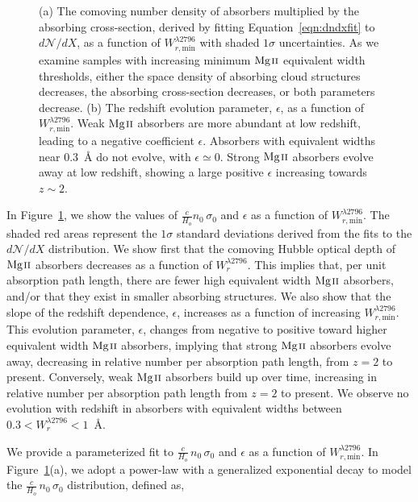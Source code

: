\begin{figure*}[bth]
\caption{(a) The comoving number density of absorbers multiplied by the absorbing cross-section, derived by fitting Equation~\ref{eqn:dndxfit} to $d\mathcal{N}\!/dX$, as a function of $W_{r,\mathrm{min}}^{\lambda2796}$ with shaded $1\sigma$ uncertainties. As we examine samples with increasing minimum ${\hbox{{\rm Mg}\kern 0.1em{\sc ii}}}$ equivalent width thresholds, either the space density of absorbing cloud structures decreases, the absorbing cross-section decreases, or both parameters decrease. (b) The redshift evolution parameter, $\epsilon$, as a function of $W_{r,\mathrm{min}}^{\lambda2796}$. Weak ${\hbox{{\rm Mg}\kern 0.1em{\sc ii}}}$ absorbers are more abundant at low redshift, leading to a negative coefficient $\epsilon$. Absorbers with equivalent widths near $0.3$~{\AA} do not evolve, with $\epsilon \simeq 0$. Strong ${\hbox{{\rm Mg}\kern 0.1em{\sc ii}}}$ absorbers evolve away at low redshift, showing a large positive $\epsilon$ increasing towards $z \sim 2$.}
\label{fig:nsigmaepsilon}
\end{figure*}

In Figure~\ref{fig:nsigmaepsilon}, we show the values of $\frac{c}{H_o}n_0\,\sigma_0$ and $\epsilon$ as a function of $W_{r,\mathrm{min}}^{\lambda2796}$. The shaded red areas represent the $1\sigma$ standard deviations derived from the fits to the $d\mathcal{N}\!/dX$ distribution. We show first that the comoving Hubble optical depth of ${\hbox{{\rm Mg}\kern 0.1em{\sc ii}}}$ absorbers decreases as a function of $W_r^{\lambda2796}$. This implies that, per unit absorption path length, there are fewer high equivalent width ${\hbox{{\rm Mg}\kern 0.1em{\sc ii}}}$ absorbers, and/or that they exist in smaller absorbing structures. We also show that the slope of the redshift dependence, $\epsilon$, increases as a function of increasing $W_{r,\mathrm{min}}^{\lambda2796}$. This evolution parameter, $\epsilon$, changes from negative to positive toward higher equivalent width ${\hbox{{\rm Mg}\kern 0.1em{\sc ii}}}$ absorbers, implying that strong ${\hbox{{\rm Mg}\kern 0.1em{\sc ii}}}$ absorbers evolve away, decreasing in relative number per absorption path length, from $z = 2$ to present. Conversely, weak ${\hbox{{\rm Mg}\kern 0.1em{\sc ii}}}$ absorbers build up over time, increasing in relative number per absorption path length from $z = 2$ to present. We observe no evolution with redshift in absorbers with equivalent widths between $0.3 < W_r^{\lambda2796} < 1$~{\AA}.

We provide a parameterized fit to $\frac{c}{H_o}\,n_0\,\sigma_0$ and $\epsilon$ as a function of $W_{r,\mathrm{min}}^{\lambda2796}$. In Figure~\ref{fig:nsigmaepsilon}(a), we adopt a power-law with a generalized exponential decay to model the $\frac{c}{H_o}\,n_0\,\sigma_0$ distribution, defined as,

